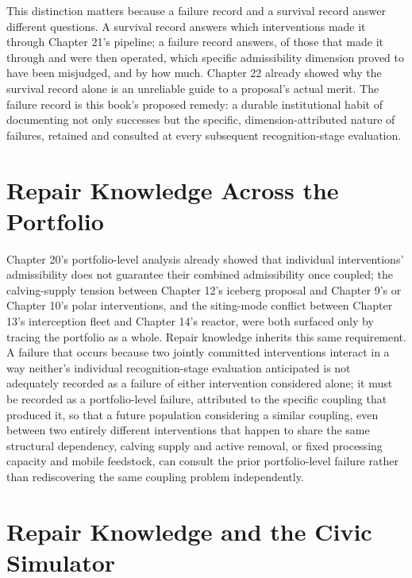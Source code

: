 \documentclass[11pt,oneside]{book}
\begin{document}
This distinction matters because a failure record and a survival record answer different questions. A survival record answers which interventions made it through Chapter 21's pipeline; a failure record answers, of those that made it through and were then operated, which specific admissibility dimension proved to have been misjudged, and by how much. Chapter 22 already showed why the survival record alone is an unreliable guide to a proposal's actual merit. The failure record is this book's proposed remedy: a durable institutional habit of documenting not only successes but the specific, dimension-attributed nature of failures, retained and consulted at every subsequent recognition-stage evaluation.

\section*{Repair Knowledge Across the Portfolio}

Chapter 20's portfolio-level analysis already showed that individual interventions' admissibility does not guarantee their combined admissibility once coupled; the calving-supply tension between Chapter 12's iceberg proposal and Chapter 9's or Chapter 10's polar interventions, and the siting-mode conflict between Chapter 13's interception fleet and Chapter 14's reactor, were both surfaced only by tracing the portfolio as a whole. Repair knowledge inherits this same requirement. A failure that occurs because two jointly committed interventions interact in a way neither's individual recognition-stage evaluation anticipated is not adequately recorded as a failure of either intervention considered alone; it must be recorded as a portfolio-level failure, attributed to the specific coupling that produced it, so that a future population considering a similar coupling, even between two entirely different interventions that happen to share the same structural dependency, calving supply and active removal, or fixed processing capacity and mobile feedstock, can consult the prior portfolio-level failure rather than rediscovering the same coupling problem independently.

\section*{Repair Knowledge and the Civic Simulator}
\end{document}
